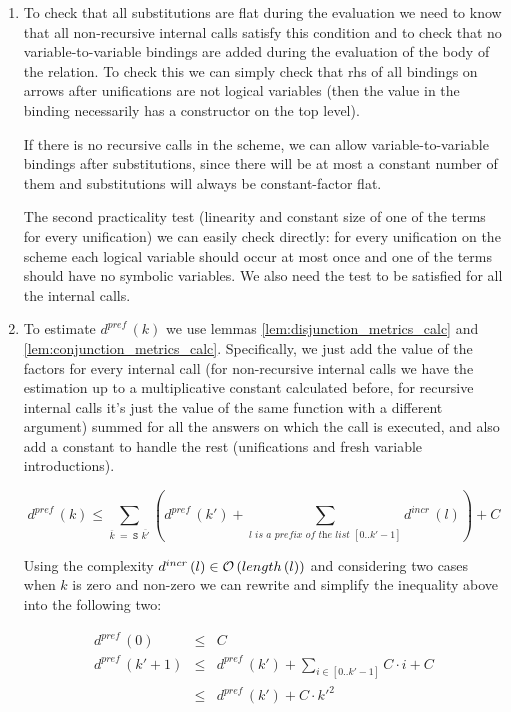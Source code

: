 \begin{enumerate}
\item To check that all substitutions are flat during the evaluation we need to know that all non-recursive internal calls satisfy this condition and to check that no variable-to-variable bindings are added during the evaluation of the body of the relation. To check this we can simply check that rhs of all bindings on arrows after unifications are not logical variables (then the value in the binding
necessarily has a constructor on the top level).

If there is no recursive calls in the scheme, we can allow variable-to-variable bindings after substitutions, since there will be at most a constant number of them and substitutions will always be constant-factor flat.

The second practicality test (linearity and constant size of one of the terms for every unification) we can easily check directly: for every unification on the scheme each logical variable should occur at most once and one of the terms should have no symbolic variables. We also need the test to be satisfied for all the internal calls.

\item To estimate $d^{pref}\,(k)$ we use lemmas \ref{lem:disjunction_metrics_calc} and \ref{lem:conjunction_metrics_calc}. Specifically, we just add the value of the factors for every internal call
  (for non-recursive internal calls we have the estimation up to a multiplicative constant calculated before, for recursive internal calls it's just the value of the same function with a
  different argument) summed for all the answers on which the call is executed, and also add a constant to handle the rest (unifications and fresh variable introductions).

\[ d^{pref}\,(k) \le \sum_{\overline{k} \;=\; \texttt{S $\overline{k'}$}} (d^{pref}\,(k') + \sum_{\textit{$l$ is a prefix of the list $[0..k' - 1]$}} d^{incr}\,(l)) + C \]

Using the complexity $d^{incr}\,(l) \in \mathcal{O}\,(length\,(l))$ and considering two cases when $k$ is zero and non-zero we can rewrite and simplify the inequality above into the following two:

\[
\begin{array}{lcl}
d^{pref}\,(0) &\le& C \\
d^{pref}\,(k' + 1) &\le& d^{pref}\,(k') + \sum_{i \in [0..k' - 1]} C \cdot i + C \\
            &\le& d^{pref}\,(k') + C \cdot k'^2 
\end{array} \]


\end{enumerate}
